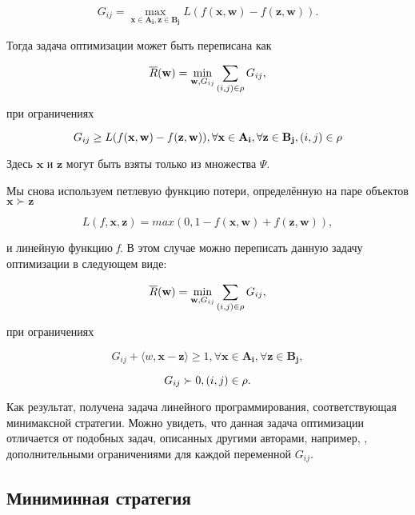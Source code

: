 \documentclass[12pt,a4paper,oneside]{article}
\begin{document}
\[
G_{ij} = \underset{\mathbf{x} \in \mathbf{A_i}, \mathbf{z} \in \mathbf{B_j}}{\operatorname{max}} L (f (\mathbf{x}, \mathbf{w}) - f(\mathbf{z}, \mathbf{w})). 
\]

\par
Тогда задача оптимизации может быть переписана как

\[
\overline{R}(\mathbf{w}) = \underset{\mathbf{w}, G_{ij}}{\operatorname{min}} \sum \limits_{(i, j) \in \mathrm{\rho}} G_{ij},
\]

\par
при ограничениях

\[
G_{ij} \geq L (f(\mathbf{x}, \mathbf{w}) - f(\mathbf{z}, \mathbf{w})), \forall \mathbf{x} \in \mathbf{A_i}, \forall \mathbf{z} \in \mathbf{B_j}, (i, j) \in \mathrm{\rho}
\]

\par
Здесь \(\mathbf{x}\) и \(\mathbf{z}\) могут быть взяты только из множества \(\Psi\). 

\par
Мы снова используем петлевую функцию потери, определённую на паре объектов \(\mathbf{x} \succ \mathbf{z}\)

\[
L(f, \mathbf{x}, \mathbf{z}) = max (0,1 - f(\mathbf{x}, \mathbf{w}) + f(\mathbf{z}, \mathbf{w})),
\]

\par
и линейную функцию \emph{f}. 
В этом случае можно переписать данную задачу оптимизации в следующем виде:

\[
\overline{R}(\mathbf{w}) = \underset{\mathbf{w}, G_{ij}}{\operatorname{min}} \sum \limits_{(i, j) \in \mathrm{\rho}} G_{ij},
\]

\par
при ограничениях

\[
G_{ij} + \langle w, \mathbf{x} - \mathbf{z} \rangle \geq 1, \forall \mathbf{x} \in \mathbf{A_i}, \forall \mathbf{z} \in \mathbf{B_j}, 
\]

\[
G_{ij} \succ 0, (i, j) \in \mathrm{\rho}.
\]

\par
Как результат, получена задача линейного программирования, соответствующая минимаксной стратегии. 
Можно увидеть, что данная задача оптимизации отличается от подобных задач, описанных другими авторами, например, , дополнительными ограничениями для каждой переменной \(G_{ij}\). 


\subsection{Миниминная стратегия}
\end{document}

